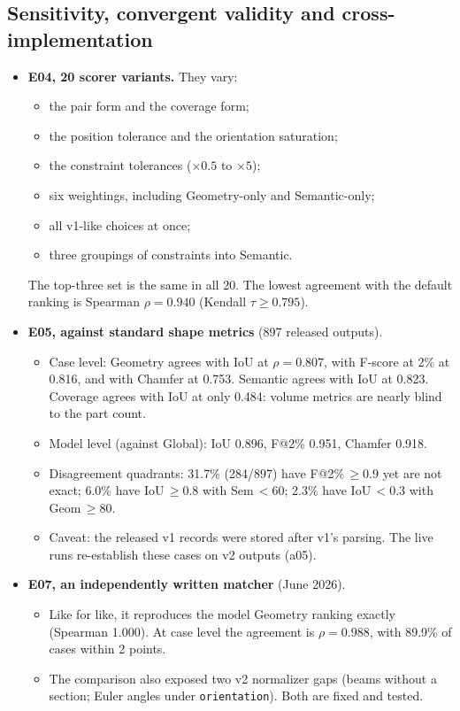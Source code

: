 \documentclass[10pt,a4paper]{article}
\begin{document}
\subsection{Sensitivity, convergent validity and cross-implementation}
\begin{itemize}
\item \textbf{E04, 20 scorer variants.} They vary:
  \begin{itemize}
  \item the pair form and the coverage form;
  \item the position tolerance and the orientation saturation;
  \item the constraint tolerances ($\times0.5$ to $\times5$);
  \item six weightings, including Geometry-only and Semantic-only;
  \item all v1-like choices at once;
  \item three groupings of constraints into Semantic.
  \end{itemize}
  The top-three set is the same in all 20. The lowest agreement with the default ranking is Spearman $\rho=0.940$ (Kendall $\tau\geq0.795$).
\item \textbf{E05, against standard shape metrics} (897 released outputs).
  \begin{itemize}
  \item Case level: Geometry agrees with IoU at $\rho=0.807$, with F-score at 2\% at 0.816, and with Chamfer at 0.753. Semantic agrees with IoU at 0.823. Coverage agrees with IoU at only 0.484: volume metrics are nearly blind to the part count.
  \item Model level (against Global): IoU 0.896, F@2\% 0.951, Chamfer 0.918.
  \item Disagreement quadrants: 31.7\% (284/897) have F@2\%$\,\geq0.9$ yet are not exact; 6.0\% have IoU$\,\geq0.8$ with Sem$\,<60$; 2.3\% have IoU$\,<0.3$ with Geom$\,\geq80$.
  \item Caveat: the released v1 records were stored after v1's parsing. The live runs re-establish these cases on v2 outputs (a05).
  \end{itemize}
\item \textbf{E07, an independently written matcher} (June 2026).
  \begin{itemize}
  \item Like for like, it reproduces the model Geometry ranking exactly (Spearman 1.000). At case level the agreement is $\rho=0.988$, with 89.9\% of cases within 2 points.
  \item The comparison also exposed two v2 normalizer gaps (beams without a section; Euler angles under \texttt{orientation}). Both are fixed and tested.

\end{itemize}
\end{itemize}
\end{document}
